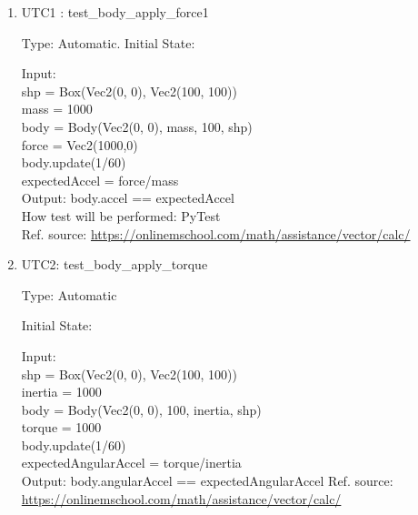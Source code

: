 \documentclass[12pt, titlepage]{article}
\begin{document}
\begin{enumerate}
	

\item{UTC1} {: test\_body\_apply\_force1 \\}

Type: Automatic.
Initial State: 

Input: \\
shp = Box(Vec2(0, 0), Vec2(100, 100))\\
mass = 1000\\
body = Body(Vec2(0, 0), mass, 100, shp)\\
force = Vec2(1000,0)\\
body.update(1/60)\\
expectedAccel = force/mass\\

Output: body.accel == expectedAccel\\	
How test will be performed: PyTest\\ 
Ref. source: \url{https://onlinemschool.com/math/assistance/vector/calc/}
					
\item{UTC2}{: test\_body\_apply\_torque\\}

Type: Automatic

Initial State: 

Input: \\
shp = Box(Vec2(0, 0), Vec2(100, 100))\\
inertia = 1000\\
body = Body(Vec2(0, 0), 100, inertia, shp)\\
torque = 1000\\
body.update(1/60)\\
expectedAngularAccel = torque/inertia\\

Output: body.angularAccel == expectedAngularAccel
Ref. source: \url{https://onlinemschool.com/math/assistance/vector/calc/}

%
%
%
%
%					
%
%
%
%
%
%


\end{enumerate}
\end{document}
